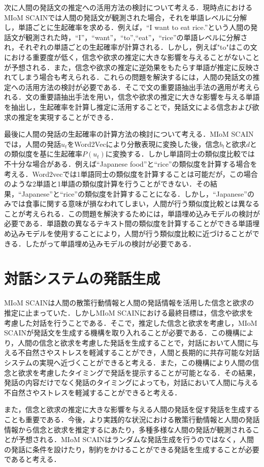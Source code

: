 \par
次に人間の発話文の推定への活用方法の検討について考える．現時点におけるMIoM SCAINでは人間の発話文が観測された場合，それを単語レベルに分解し，単語ごとに生起確率を求める．例えば，``I want to eat rice.''という人間の発話文が観測された時，``I''，``want''，``to'',``eat''，``rice''の単語レベルに分解され，それぞれの単語ごとの生起確率が計算される．しかし，例えば"to"はこの文における重要度が低く，信念や欲求の推定に大きな影響を与えることがないことが予想される．また，信念や欲求の推定に逆効果をもたらす単語が推定に反映されてしまう場合も考えられる．これらの問題を解決するには，人間の発話文の推定への活用方法の検討が必要である．そこで文の重要語抽出手法の適用が考えられる．文の重要語抽出手法を用い，信念や欲求の推定に大きな影響を与える単語を抽出し，生起確率を計算し推定に活用することで，発話文による信念および欲求の推定を実現することができる．

\par
最後に人間の発話の生起確率の計算方法の検討について考える．MIoM SCAINでは，人間の発話$u_t$をWord2Vecにより分散表現に変換した後，信念$b_t$と欲求$d$との類似度を基に生起確率$P(u_t)$に変換する．しかし単語同士の類似度比較では不十分な場合がある．例えば``Japanese food''と``rice''の類似度を計算する場合を考える．Word2vecでは1単語同士の類似度を計算することは可能だが，この場合のような2単語と1単語の類似度計算を行うことができない．その結果，``Japanese''と``rice''の類似度を計算することになる．しかし，``Japanese''のみでは食事に関する意味が損なわれてしまい，人間が行う類似度比較とは異なることが考えられる．この問題を解決するためには，単語埋め込みモデルの検討が必要である．単語数の異なるテキスト間の類似度を計算することができる単語埋め込みモデルを使用することにより，人間が行う類似度比較に近づけることができる．したがって単語埋め込みモデルの検討が必要である．


\section{対話システムの発話生成}

\par
MIoM SCAINは人間の散策行動情報と人間の発話情報を活用した信念と欲求の推定に止まっていた．しかしMIoM SCAINにおける最終目標は，信念や欲求を考慮した対話を行うことである．そこで，推定した信念と欲求を考慮し，MIoM SCAINが発話文を生成する機構を取り入れることが必要である．この機構により，人間の信念と欲求を考慮した発話を生成することで，対話において人間に与える不自然さやストレスを軽減することができ，人間と長期的に共存可能な対話システムの実現へ近づくことができると考える．また，この機構により人間の信念と欲求を考慮したタイミングで発話を提示することが可能となる．その結果，発話の内容だけでなく発話のタイミングによっても，対話において人間に与える不自然さやストレスを軽減することができると考える．

\par
また，信念と欲求の推定に大きな影響を与える人間の発話を促す発話を生成することも重要である．今後，より実践的な状況における散策行動情報と人間の発話情報から信念と欲求を推定するにあたり，多種多様な人間の発話が観測されることが予想される．MIoM SCAINはランダムな発話生成を行うのではなく，人間の発話に条件を設けたり，制約をかけることができる発話を生成することが必要であると考える．
